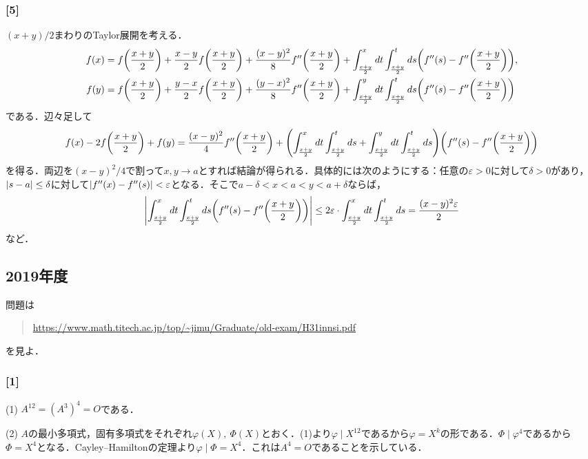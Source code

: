 \documentclass[a4j]{ltjsarticle}
\newcommand{\1}{\mathbbm{1}}
\numberwithin{equation}{section}
\theoremstyle{definition}
\begin{document}
\subsubsection*{[5]}
$(x+y)/2$まわりのTaylor展開を考える．
\begin{align}
    f(x)&=f\qty(\frac{x+y}{2})+\frac{x-y}{2}f\qty(\frac{x+y}{2})+\frac{(x-y)^2}{8}f''\qty(\frac{x+y}{2})+\int^{x}_{\frac{x+y}{2}}dt\int^{t}_{\frac{x+y}{2}}ds\qty(f''(s)-f''\qty(\frac{x+y}{2})),\\
    f(y)&=f\qty(\frac{x+y}{2})+\frac{y-x}{2}f\qty(\frac{x+y}{2})+\frac{(y-x)^2}{8}f''\qty(\frac{x+y}{2})+\int^{y}_{\frac{x+y}{2}}dt\int^{t}_{\frac{x+y}{2}}ds\qty(f''(s)-f''\qty(\frac{x+y}{2}))
\end{align}
である．辺々足して
\begin{equation}
    f(x)-2f\qty(\frac{x+y}{2})+f(y)=\frac{(x-y)^2}{4}f''\qty(\frac{x+y}{2})+\qty(\int^{x}_{\frac{x+y}{2}}dt\int^{t}_{\frac{x+y}{2}}ds+\int^{y}_{\frac{x+y}{2}}dt\int^{t}_{\frac{x+y}{2}}ds)\qty(f''(s)-f''\qty(\frac{x+y}{2}))
\end{equation}
を得る．両辺を$(x-y)^2/4$で割って$x,y\to a$とすれば結論が得られる．具体的には次のようにする：任意の$\varepsilon>0$に対して$\delta>0$があり，$\abs{s-a}\leq \delta$に対して$\abs{f''(x)-f''(s)}< \varepsilon$となる．そこで$a-\delta<x<a<y<a+\delta$ならば，
\begin{equation}
    \abs{\int^{x}_{\frac{x+y}{2}}dt\int^{t}_{\frac{x+y}{2}}ds\qty(f''(s)-f''\qty(\frac{x+y}{2}))}\leq 2\varepsilon\cdot \int^{x}_{\frac{x+y}{2}}dt\int^{t}_{\frac{x+y}{2}}ds=\frac{(x-y)^2\varepsilon}{2}
\end{equation}
など．
\subsection{2019年度}
問題は
\begin{quote}
    \url{https://www.math.titech.ac.jp/top/~jimu/Graduate/old-exam/H31innsi.pdf}
\end{quote}
を見よ．
\subsubsection*{[1]}
(1) $A^{12}=(A^3)^4=O$である．

(2) $A$の最小多項式，固有多項式をそれぞれ$\varphi(X),\ \Phi(X)$とおく．(1)より$\varphi\mid X^{12}$であるから$\varphi=X^k$の形である．$\Phi\mid \varphi^4$であるから$\Phi=X^4$となる．Cayley--Hamiltonの定理より$\varphi\mid \Phi=X^4$．これは$A^4=O$であることを示している．
\end{document}
